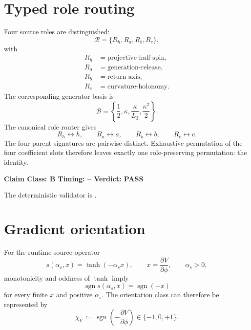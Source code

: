 \documentclass[11pt,a4paper,twoside]{book}
\theoremstyle{definition}
\newcommand{\vTwelveStatus}[3]{\par\noindent\textbf{Claim Class: #1 \quad Timing: #2 \quad Verdict: #3}\par}
\begin{document}
\section{Typed role routing}
Four source roles are distinguished:
\[
\mathcal R
=\{R_h,R_a,R_b,R_c\},
\]
with
\begin{align}
R_h&=\text{projective-half-spin},\\
R_a&=\text{generation-release},\\
R_b&=\text{return-axis},\\
R_c&=\text{curvature-holonomy}.
\end{align}
The corresponding generator basis is
\begin{equation}
\mathcal B
=\left\{
\frac12,
\kappa,
\frac{\kappa}{L_3},
\frac{\kappa^2}{2}
\right\}.
\label{eq:v12-generator-basis}
\end{equation}
The canonical role router gives
\begin{equation}
\boxed{
R_h\leftrightarrow h,
\qquad
R_a\leftrightarrow a,
\qquad
R_b\leftrightarrow b,
\qquad
R_c\leftrightarrow c.
}
\label{eq:v12-role-slot-map}
\end{equation}
The four parent signatures are pairwise distinct. Exhaustive permutation of the
four coefficient slots therefore leaves exactly one role-preserving
permutation: the identity.

\vTwelveStatus{B}{--}{PASS}
The deterministic validator is
.

\section{Gradient orientation}
For the runtime source operator
\begin{equation}
s(\alpha_s,x)=\tanh(-\alpha_s x),
\qquad
x=\frac{\partial V}{\partial\phi},
\qquad
\alpha_s>0,
\label{eq:v12-gradient-source}
\end{equation}
monotonicity and oddness of $\tanh$ imply
\begin{equation}
\boxed{
\operatorname{sgn}s(\alpha_s,x)
=\operatorname{sgn}(-x)
}
\label{eq:v12-gradient-sign}
\end{equation}
for every finite $x$ and positive $\alpha_s$. The orientation class can
therefore be represented by
\begin{equation}
\boxed{
\chi_{\nabla}
:=\operatorname{sgn}\!\left(-\frac{\partial V}{\partial\phi}\right)
\in\{-1,0,+1\}.
}
\label{eq:v12-gradient-orientation}
\end{equation}
\end{document}
